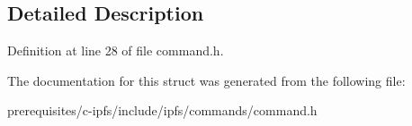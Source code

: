 \subsection{Detailed Description}


Definition at line 28 of file command.\+h.



The documentation for this struct was generated from the following file\+:\begin{DoxyCompactItemize}
\item 
prerequisites/c-\/ipfs/include/ipfs/commands/command.\+h\end{DoxyCompactItemize}
